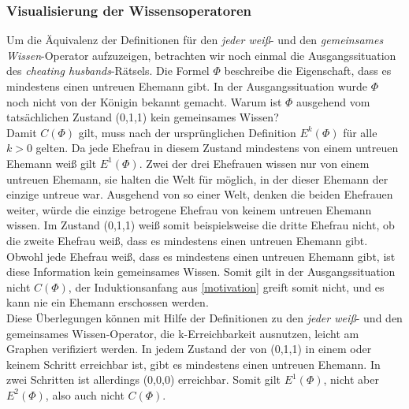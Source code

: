 \subsubsection{Visualisierung der Wissensoperatoren}
Um die Äquivalenz der Definitionen für den \textit{jeder weiß}- und den \textit{gemeinsames Wissen}-Operator aufzuzeigen, betrachten wir noch einmal die Ausgangssituation des \textit{cheating husbands}-Rätsels. 
Die Formel $\Phi$ beschreibe die Eigenschaft, dass es mindestens einen untreuen Ehemann gibt.
In der Ausgangssituation wurde $\Phi$ noch nicht von der Königin bekannt gemacht.
Warum ist $\Phi$ ausgehend vom tatsächlichen Zustand (0,1,1) kein gemeinsames Wissen?\\
Damit $C(\Phi)$ gilt, muss nach der ursprünglichen Definition $E^k(\Phi)$ für alle $k>0$ gelten.
Da jede Ehefrau in diesem Zustand mindestens von einem untreuen Ehemann weiß gilt $E^1(\Phi)$.
Zwei der drei Ehefrauen wissen nur von einem untreuen Ehemann, sie halten die Welt für möglich, in der dieser Ehemann der einzige untreue war.
Ausgehend von so einer Welt, denken die beiden Ehefrauen weiter, würde die einzige betrogene Ehefrau von keinem untreuen Ehemann wissen.
Im Zustand (0,1,1) weiß somit beispielsweise die dritte Ehefrau nicht, ob die zweite Ehefrau weiß, dass es mindestens einen untreuen Ehemann gibt.
Obwohl jede Ehefrau weiß, dass es mindestens einen untreuen Ehemann gibt, ist diese Information kein gemeinsames Wissen.
Somit gilt in der Ausgangssituation nicht $C(\Phi)$, der Induktionsanfang aus \ref{motivation} greift somit nicht, und es kann nie ein Ehemann erschossen werden.\\

Diese Überlegungen können mit Hilfe der Definitionen zu den \textit{jeder weiß}- und den gemeinsames Wissen-Operator, die k-Erreichbarkeit ausnutzen, leicht am Graphen verifiziert werden.
In jedem Zustand der von (0,1,1) in einem oder keinem Schritt erreichbar ist, gibt es mindestens einen untreuen Ehemann. In zwei Schritten ist allerdings (0,0,0) erreichbar. Somit gilt $E^1(\Phi)$, nicht aber $E^2(\Phi)$, also auch nicht $C(\Phi)$.\medskip

